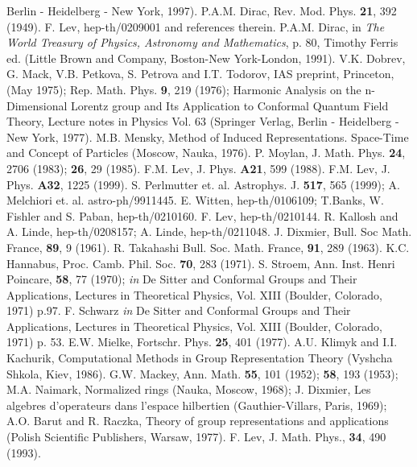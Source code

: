 \documentclass[a4paper,12pt]{article}%
\begin{document}
\begin{thebibliography}{99}
Berlin - Heidelberg - New York, 1997).
 P.A.M. Dirac, Rev. Mod. Phys. {\bf 21}, 392 (1949).
 F. Lev, hep-th/0209001 and references therein.
 P.A.M. Dirac, in {\it The World Treasury
of Physics, Astronomy and Mathematics}, p. 80, Timothy Ferris ed.
(Little Brown and Company, Boston-New York-London, 1991).
 V.K. Dobrev, G. Mack, V.B. Petkova, 
S. Petrova and I.T. Todorov, IAS preprint, Princeton, (May 
1975); Rep. Math. Phys. {\bf 9}, 219 (1976);
Harmonic Analysis on the n-Dimensional Lorentz 
group and Its Application to Conformal Quantum Field Theory,
Lecture notes in Physics Vol. 63 (Springer Verlag,
Berlin - Heidelberg - New York, 1977). 
 M.B. Mensky, Method of Induced Representations.
Space-Time and Concept of Particles (Moscow, Nauka, 1976). 
 P. Moylan, J. Math. Phys. {\bf 24}, 2706 (1983);
{\bf 26}, 29 (1985).
 F.M. Lev, J. Phys. {\bf A21}, 599 (1988).
 F.M. Lev, J. Phys. {\bf A32}, 1225 (1999).
 S. Perlmutter et. al. Astrophys. J. {\bf 517},
565 (1999); A. Melchiori et. al. astro-ph/9911445.
 E. Witten, hep-th/0106109; T.Banks, W. Fishler
and S. Paban, hep-th/0210160.
 F. Lev, hep-th/0210144.
 R. Kallosh and A. Linde, hep-th/0208157;
A. Linde, hep-th/0211048.
 J. Dixmier, Bull. Soc Math. France, {\bf 89}, 9 (1961).
 R. Takahashi Bull. Soc. Math. France, {\bf 91}, 289 (1963).
 K.C. Hannabus, Proc. Camb. Phil. Soc. {\bf 70}, 283 (1971).
 S. Stroem,  Ann. Inst. Henri Poincare, {\bf 58}, 
77 (1970); {\it in} De Sitter and Conformal Groups and
Their Applications, Lectures in Theoretical Physics, Vol. XIII
(Boulder, Colorado, 1971) p.97.
 F. Schwarz {\it in} De Sitter and Conformal Groups and
Their Applications, Lectures in Theoretical Physics, Vol. XIII
(Boulder, Colorado, 1971) p. 53. 
 E.W. Mielke, Fortschr. Phys. {\bf 25}, 401 (1977).
 A.U. Klimyk and I.I. Kachurik, Computational 
Methods in Group Representation Theory 
(Vyshcha Shkola, Kiev, 1986).
 G.W. Mackey, Ann. Math. {\bf 55}, 101 (1952); 
{\bf 58}, 193 (1953); M.A. Naimark, Normalized rings 
(Nauka, Moscow, 1968);
J. Dixmier, Les  algebres  d'operateurs dans l'espace
   hilbertien (Gauthier-Villars, Paris, 1969);
 A.O. Barut and R. Raczka, Theory of group 
   representations  and
   applications (Polish  Scientific  Publishers, Warsaw, 1977). 
 F. Lev, J. Math. Phys., {\bf 34}, 490 (1993).

\end{thebibliography}
\end{document}
